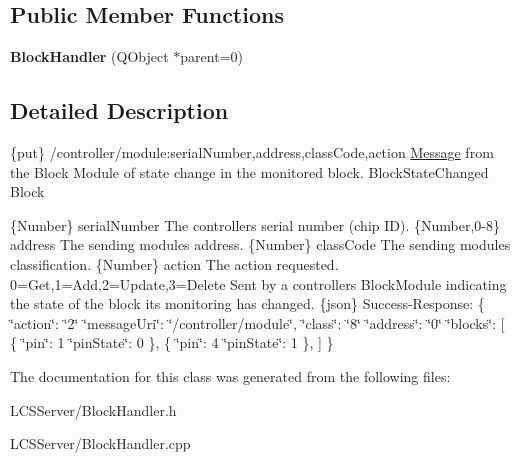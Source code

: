 \subsection*{Public Member Functions}
\begin{DoxyCompactItemize}
\item 
\mbox{\label{class_block_handler_a47dd8ca4a026321dc6401f2589c28980}} 
{\bfseries Block\+Handler} (Q\+Object $\ast$parent=0)
\end{DoxyCompactItemize}


\subsection{Detailed Description}
\{put\} /controller/module\+:serial\+Number,address,class\+Code,action \hyperlink{class_message}{Message} from the Block Module of state change in the monitored block.  Block\+State\+Changed  Block

\{Number\} serial\+Number The controller\textquotesingle{}s serial number (chip ID).  \{Number,0-\/8\} address The sending module\textquotesingle{}s address.  \{Number\} class\+Code The sending module\textquotesingle{}s classification.  \{Number\} action The action requested. 0=Get,1=Add,2=Update,3=Delete  Sent by a controller\textquotesingle{}s Block\+Module indicating the state of the block it\textquotesingle{}s monitoring has changed.  \{json\} Success-\/\+Response\+: \{ \char`\"{}action\char`\"{}\+: \char`\"{}2\char`\"{} \char`\"{}message\+Uri\char`\"{}\+: \char`\"{}/controller/module\char`\"{}, \char`\"{}class\char`\"{}\+: \char`\"{}8\char`\"{} \char`\"{}address\char`\"{}\+: \char`\"{}0\char`\"{} \char`\"{}blocks\char`\"{}\+: \mbox{[} \{ \char`\"{}pin\char`\"{}\+: 1 \char`\"{}pin\+State\char`\"{}\+: 0 \}, \{ \char`\"{}pin\char`\"{}\+: 4 \char`\"{}pin\+State\char`\"{}\+: 1 \}, \mbox{]} \} 

The documentation for this class was generated from the following files\+:\begin{DoxyCompactItemize}
\item 
L\+C\+S\+Server/Block\+Handler.\+h\item 
L\+C\+S\+Server/Block\+Handler.\+cpp\end{DoxyCompactItemize}
